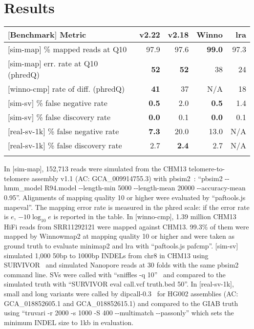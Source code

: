 \documentclass{bioinfo}
\begin{document}
\section{Results}

\begin{table}
{\footnotesize\label{tab:1}\begin{tabular}{p{4.2cm}rrrr}
\toprule
$[$Benchmark$]$ Metric & v2.22 & v2.18 & Winno & lra \\
\midrule
$[$sim-map$]$ \% mapped reads at Q10      & 97.9 & 97.6 & {\bf 99.0} & 97.3 \\
$[$sim-map$]$ err. rate at Q10 (phredQ)   & {\bf 52}   & {\bf 52}   & 38   & 24 \\
$[$winno-cmp$]$  rate of diff. (phredQ)   & {\bf 41}   & 37   & N/A  & 18 \\
$[$sim-sv$]$  \% false negative rate      & {\bf 0.5}  & 2.0  & {\bf 0.5}  & 1.4  \\
$[$sim-sv$]$  \% false discovery rate     & {\bf 0.0}  & 0.1  & {\bf 0.0}  & 0.1  \\
$[$real-sv-1k$]$ \% false negative rate   & {\bf 7.3}  & 20.0 & 13.0 & N/A \\
$[$real-sv-1k$]$ \% false discovery rate  & 2.7  & {\bf 2.4}  & 2.7  & N/A \\
\botrule
\end{tabular}}
{In $[$sim-map$]$, 152,713 reads were simulated from the CHM13 telomere-to-telomere assembly v1.1
(AC: GCA\_009914755.3) with pbsim2~\citep{Ono:2021aa}: ``pbsim2 -{}-hmm\_model R94.model -{}-length-min
5000 -{}-length-mean 20000 -{}-accuracy-mean 0.95''. Alignments of mapping quality
10 or higher were evaluated by ``paftools.js mapeval''. The mapping error rate
is measured in the phred scale: if the error rate is $e$, $-10\log_{10}e$ is
reported in the table. In $[$winno-cmp$]$, 1.39 million CHM13 HiFi reads from
SRR11292121 were mapped against CHM13. 99.3\% of them were mapped by Winnowmap2
at mapping quality 10 or higher and were taken as ground truth to evaluate
minimap2 and lra with ``paftools.js pafcmp''. $[$sim-sv$]$ simulated 1,000
50bp to 1000bp INDELs from chr8 in CHM13 using SURVIVOR~\citep{Jeffares:2017aa} and simulated Nanopore
reads at 30 folds with the same pbsim2 command line. SVs were called with
``sniffles -q 10''~\citep{Sedlazeck:2018ab} and compared to the simulated truth with ``SURVIVOR eval
call.vcf truth.bed 50''. In $[$real-sv-1k$]$, small and long variants were
called by dipcall-0.3~\citep{Li:2018aa} for HG002 assemblies (AC: GCA\_018852605.1 and
GCA\_018852615.1) and compared to the GIAB truth~\citep{Zook:2020aa} using ``truvari -r 2000 -s
1000 -S 400 -{}-multimatch -{}-passonly'' which sets the minimum INDEL size to 1kb in evaluation. }
\end{table}
\end{document}
